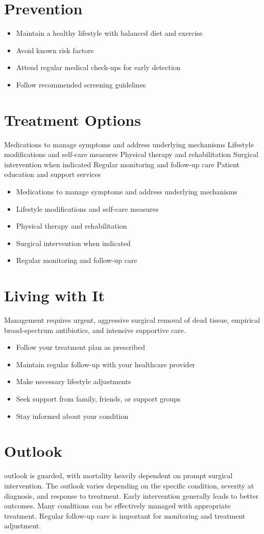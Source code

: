 \section{Prevention}
\begin{itemize}[noitemsep]
  \item Maintain a healthy lifestyle with balanced diet and exercise
  \item Avoid known risk factors
  \item Attend regular medical check-ups for early detection
  \item Follow recommended screening guidelines
\end{itemize}
\section{Treatment Options}
Medications to manage symptoms and address underlying mechanisms Lifestyle modifications and self-care measures Physical therapy and rehabilitation Surgical intervention when indicated Regular monitoring and follow-up care Patient education and support services

\begin{itemize}[noitemsep]
  \item Medications to manage symptoms and address underlying mechanisms
  \item Lifestyle modifications and self-care measures
  \item Physical therapy and rehabilitation
  \item Surgical intervention when indicated
  \item Regular monitoring and follow-up care
\end{itemize}
\section{Living with It}
Management requires urgent, aggressive surgical removal of dead tissue, empirical broad-spectrum antibiotics, and intensive supportive care.

\begin{itemize}[noitemsep]
  \item Follow your treatment plan as prescribed
  \item Maintain regular follow-up with your healthcare provider
  \item Make necessary lifestyle adjustments
  \item Seek support from family, friends, or support groups
  \item Stay informed about your condition
\end{itemize}
\section{Outlook}
outlook is guarded, with mortality heavily dependent on prompt surgical intervention. The outlook varies depending on the specific condition, severity at diagnosis, and response to treatment. Early intervention generally leads to better outcomes. Many conditions can be effectively managed with appropriate treatment. Regular follow-up care is important for monitoring and treatment adjustment.
